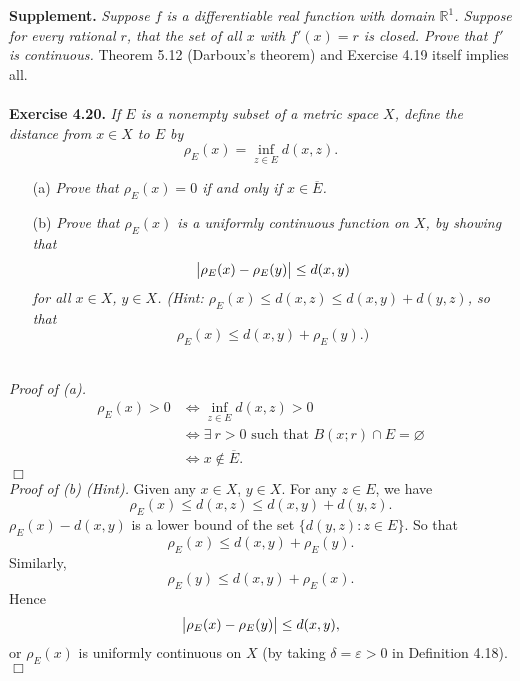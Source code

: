 \documentclass{article}
\begin{document}
\textbf{Supplement.}
\emph{Suppose $f$ is a differentiable real function with domain $\mathbb{R}^1$.
Suppose for every rational $r$,
that the set of all $x$ with $f'(x)=r$ is closed.
Prove that $f'$ is continuous.}
Theorem 5.12 (Darboux's theorem) and Exercise 4.19 itself implies all.
\\\\






\textbf{Exercise 4.20.}
\emph{If $E$ is a nonempty subset of a metric space $X$,
define the distance from $x \in X$ to $E$ by
\[
  \rho_E(x) = \inf_{z \in E} d(x,z).
\]}
\begin{enumerate}
  \item[(a)]
  \emph{Prove that $\rho_E(x) = 0$ if and only if $x \in \overline{E}$.}

  \item[(b)]
  \emph{Prove that $\rho_E(x)$ is a uniformly continuous function on $X$,
  by showing that
  \[
    \abs{ \rho_E(x) - \rho_E(y) } \leq d(x,y)
  \]
  for all $x \in X$, $y \in X$.
  (Hint: $\rho_E(x) \leq d(x,z) \leq d(x,y) + d(y,z)$, so that
  \[
    \rho_E(x) \leq d(x,y) + \rho_E(y).)
  \]} \\
\end{enumerate}

\emph{Proof of (a).}
\begin{align*}
  \rho_E(x) > 0
  &\Longleftrightarrow
  \inf_{z \in E} d(x,z) > 0 \\
  &\Longleftrightarrow
  \exists \: r > 0 \text{ such that } B(x;r) \cap E = \varnothing \\
  &\Longleftrightarrow
  x \not\in \overline{E}.
\end{align*}
$\Box$ \\

\emph{Proof of (b) (Hint).}
Given any $x \in X$, $y \in X$.
For any $z \in E$, we have
\[
  \rho_E(x) \leq d(x,z) \leq d(x,y) + d(y,z).
\]
$\rho_E(x) - d(x,y)$ is a lower bound of the set $\{ d(y,z) : z \in E \}$.
So that
\[
  \rho_E(x) \leq d(x,y) + \rho_E(y).
\]
Similarly,
\[
  \rho_E(y) \leq d(x,y) + \rho_E(x).
\]
Hence
\[
  \abs{ \rho_E(x) - \rho_E(y) } \leq d(x,y),
\]
or $\rho_E(x)$ is uniformly continuous on $X$
(by taking $\delta = \varepsilon > 0$ in Definition 4.18).
$\Box$ \\\\
\end{document}
